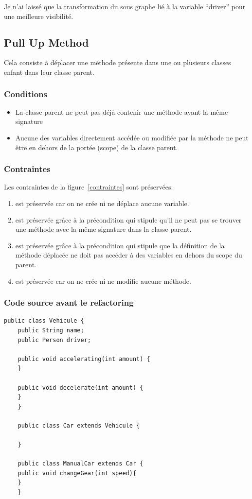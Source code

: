 \documentclass[a4paper, 12pt]{article}
\begin{document}
  Je n'ai laissé que la transformation du sous graphe lié à la variable ``driver'' pour une meilleure visibilité.

\clearpage

  \subsection{Pull Up Method}

  Cela consiste à déplacer une méthode présente dans une ou plusieurs classes enfant dans leur classe parent.

  \subsubsection{Conditions}

  \begin{itemize}[label=\textbullet]
    \item La classe parent ne peut pas déjà contenir une méthode ayant la même signature
    \item Aucune des variables directement accédée ou modifiée par la méthode ne peut être en dehors de la portée (scope) de la classe parent.
  \end{itemize}

  \subsubsection{Contraintes}

  Les contraintes de la figure~\ref{contraintes} sont préservées:
  \begin{enumerate}
    \item est préservée car on ne crée ni ne déplace aucune variable.
    \item est préservée grâce à la précondition qui stipule qu'il ne peut pas se trouver une méthode avec la même signature dans la classe parent.
    \item est préservée grâce à la précondition qui stipule que la définition de la méthode déplacée ne doit pas accéder à des variables en dehors du scope du parent.
    \item est préservée car on ne crée ni ne modifie aucune méthode.
  \end{enumerate}

  \subsubsection{Code source avant le refactoring}
  \begin{lstlisting}[frame=single]
    public class Vehicule {
    public String name;
    public Person driver;

    public void accelerating(int amount) {
    }

    public void decelerate(int amount) {
    }
    }

    public class Car extends Vehicule {

    }

    public class ManualCar extends Car {
    public void changeGear(int speed){
    }
    }
  \end{lstlisting}
\end{document}
